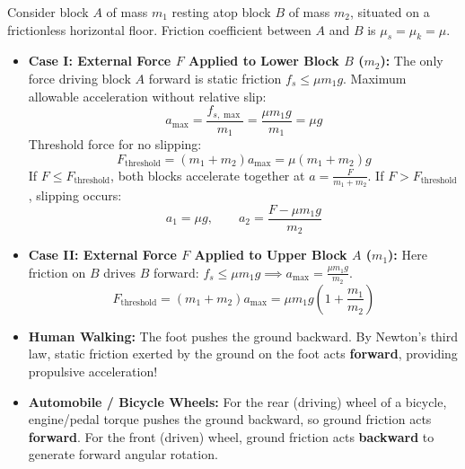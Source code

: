 \documentclass[10pt,a4paper]{article}
\begin{document}
\begin{usecasebox}
Consider block $A$ of mass $m_1$ resting atop block $B$ of mass $m_2$, situated on a frictionless horizontal floor. Friction coefficient between $A$ and $B$ is $\mu_s = \mu_k = \mu$.
\begin{itemize}
  \item \textbf{Case I: External Force $F$ Applied to Lower Block $B$ ($m_2$):}
  The only force driving block $A$ forward is static friction $f_s \le \mu m_1 g$.
  Maximum allowable acceleration without relative slip:
  \begin{equation}
    a_{\max} = \frac{f_{s,\max}}{m_1} = \frac{\mu m_1 g}{m_1} = \mu g
  \end{equation}
  Threshold force for no slipping:
  \begin{equation}
    F_{\text{threshold}} = (m_1 + m_2)a_{\max} = \mu(m_1 + m_2)g
  \end{equation}
  If $F \le F_{\text{threshold}}$, both blocks accelerate together at $a = \frac{F}{m_1 + m_2}$.
  If $F > F_{\text{threshold}}$, slipping occurs:
  \begin{equation}
    a_1 = \mu g, \qquad a_2 = \frac{F - \mu m_1 g}{m_2}
  \end{equation}
  \item \textbf{Case II: External Force $F$ Applied to Upper Block $A$ ($m_1$):}
  Here friction on $B$ drives $B$ forward: $f_s \le \mu m_1 g \implies a_{\max} = \frac{\mu m_1 g}{m_2}$.
  \begin{equation}
    F_{\text{threshold}} = (m_1 + m_2)a_{\max} = \mu m_1 g\left(1 + \frac{m_1}{m_2}\right)
  \end{equation}
\end{itemize}
\end{usecasebox}

\begin{trapbox}
\begin{itemize}
  \item \textbf{Human Walking:} The foot pushes the ground backward. By Newton's third law, static friction exerted by the ground on the foot acts \textbf{forward}, providing propulsive acceleration!
  \item \textbf{Automobile / Bicycle Wheels:} For the rear (driving) wheel of a bicycle, engine/pedal torque pushes the ground backward, so ground friction acts \textbf{forward}. For the front (driven) wheel, ground friction acts \textbf{backward} to generate forward angular rotation.
\end{itemize}
\end{trapbox}
\end{document}
